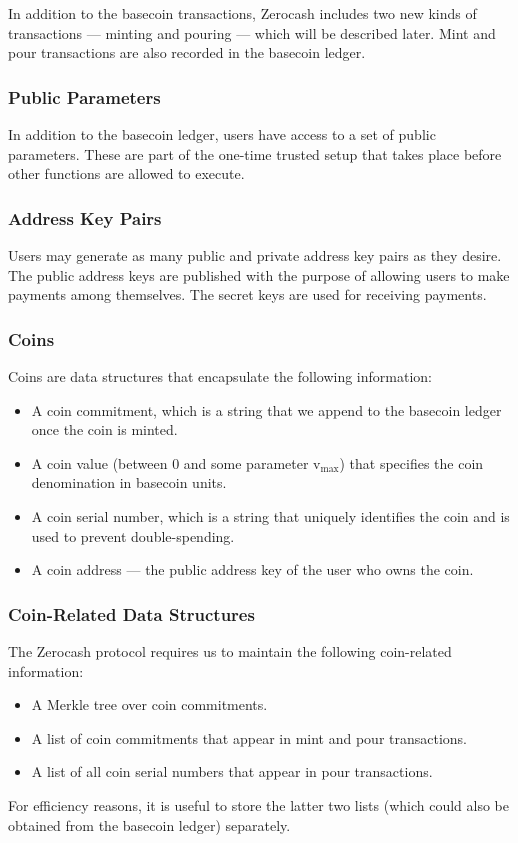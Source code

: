 \documentclass{article}
\begin{document}
In addition to the basecoin transactions, Zerocash includes two new kinds of transactions --- minting and pouring --- which will be described later. Mint and pour transactions are also recorded in the basecoin ledger.

\subsubsection{Public Parameters}
In addition to the basecoin ledger, users have access to a set of public parameters. These are part of the one-time trusted setup that takes place before other functions are allowed to execute.

\subsubsection{Address Key Pairs}
Users may generate as many public and private address key pairs as they desire. The public address keys are published with the purpose of allowing users to make payments among themselves. The secret keys are used for receiving payments.

\subsubsection{Coins}
Coins are data structures that encapsulate the following information:
\begin{itemize}
\item A coin commitment, which is a string that we append to the basecoin ledger once the coin is minted.
\item A coin value (between 0 and some parameter v$_{\text{max}}$) that specifies the coin denomination in basecoin units.
\item A coin serial number, which is a string that uniquely identifies the coin and is used to prevent double-spending.
\item A coin address --- the public address key of the user who owns the coin.
\end{itemize}

\subsubsection{Coin-Related Data Structures}
The Zerocash protocol requires us to maintain the following coin-related information:
\begin{itemize}
\item A Merkle tree over coin commitments.
\item A list of coin commitments that appear in mint and pour transactions.
\item A list of all coin serial numbers that appear in pour transactions.
\end{itemize}
For efficiency reasons, it is useful to store the latter two lists (which could also be obtained from the basecoin ledger) separately.
\end{document}

